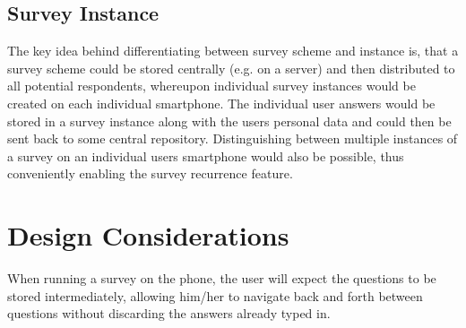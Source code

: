 \subsection{Survey Instance}
\label{subsec:surveyinstance}
The key idea behind differentiating between survey scheme and instance is, that a survey scheme could be stored centrally (e.g. on a server) and then distributed to all potential respondents, whereupon individual survey instances would be created on each individual smartphone. The individual user answers would be stored in a survey instance along with the users personal data and could then be sent back to some central repository. Distinguishing between multiple instances of a survey on an individual users smartphone would also be possible, thus conveniently enabling the survey recurrence feature.

\section{Design Considerations}
\label{sec:designconsiderations}
When running a survey on the phone, the user will expect the questions to be stored intermediately, allowing him/her to navigate back and forth between questions without discarding the answers already typed in.

